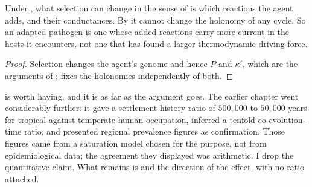 \begin{proposition}
\label{sm:prop-coev}
\lnkD{} Under , what selection can change in the
sense of  is which reactions the agent adds, and their
conductances. By  it cannot change the holonomy of
any cycle. So an adapted pathogen is one whose added reactions carry more
current in the hosts it encounters, not one that has found a larger
thermodynamic driving force.
\end{proposition}

\begin{proof}
Selection changes the agent's genome and hence $P$ and $\kappa'$, which are
the arguments of ;  fixes
the holonomies independently of both.
\end{proof}

 is worth having, and it is as far as the argument goes.
The earlier
chapter went considerably further: it gave a settlement-history ratio of
$500{,}000$ to $50{,}000$ years for tropical against temperate human
occupation, inferred a tenfold co-evolution-time ratio, and presented
regional prevalence figures as confirmation. Those figures came from a
saturation model chosen for the purpose, not from epidemiological data; the
agreement they displayed was arithmetic. I drop the quantitative claim.
What remains is  and the direction of the effect, with no
ratio attached.

